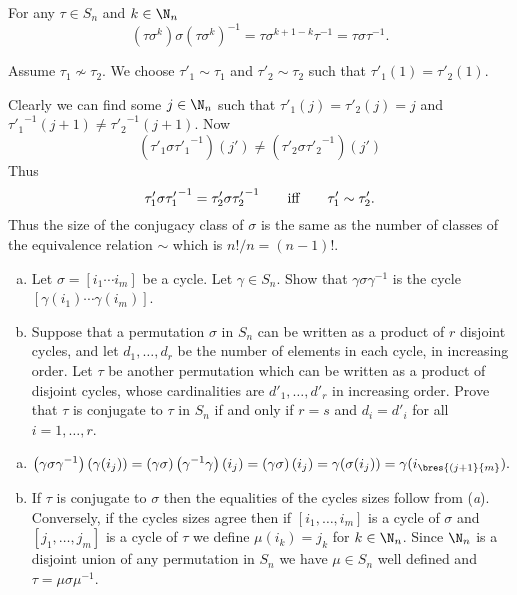 \documentclass[12pt]{book}
\newcounter{myenumi}
\newenvironment{myenumerate}
{\begin{enumerate}
 \setcounter{enumi}{\themyenumi}
}
{\setcounter{myenumi}{\theenumi}
 \end{enumerate}}
\begin{document}
\begin{myenumerate}
For any \(\tau\in S_n\) and \(k \in \N_n\)
\begin{equation*}
(\tau\sigma^k)\sigma\left(\tau\sigma^k\right)^{-1}
= \tau\sigma^{k+1-k}\tau^{-1}
= \tau\sigma\tau^{-1}.
\end{equation*}

Assume \(\tau_1 \nsim \tau_2\).
We choose \(\tau'_1 \sim \tau_1\)
and \(\tau'_2 \sim \tau_2\)
such that
\(\tau'_1(1) = \tau'_2(1)\).

Clearly we can find some \(j\in\N_n\) such that
\(\tau'_1(j) = \tau'_2(j) = j\)
and
\({\tau'_1}^{-1}(j + 1) \neq {\tau'_2}^{-1}(j + 1)\).
Now
\begin{equation*}
\left(\tau'_1 \sigma {\tau'_1}^{-1}\right)(j')
\neq
\left(\tau'_2 \sigma {\tau'_2}^{-1}\right)(j')
\end{equation*}
Thus
\begin{equation*}
\tau'_1 \sigma {\tau'_1}^{-1}
=
\tau'_2 \sigma {\tau'_2}^{-1}
\qquad \textnormal{iff} \qquad
\tau'_1 \sim \tau'_2.
\end{equation*}
Thus the size of the conjugacy class of \(\sigma\)
is the same as the number of classes of the equivalence relation \(\sim\)
which is \(n!/n = (n-1)!\).

\begin{excopy}
\begin{enumerate}[(a)]
\item
Let \(\sigma = [i_1\cdots i_m]\) be a cycle.
Let \(\gamma \in S_n\). Show that \(\gamma\sigma\gamma^{-1}\)
is  the cycle \([\gamma(i_1)\cdots \gamma(i_m)]\).
\item
Suppose that a permutation \(\sigma\) in \(S_n\) can be written
as a product of $r$ disjoint
cycles, and let \(d_1,\ldots,d_r\) be the number of elements in each cycle,
in increasing order.
 Let \(\tau\) be another permutation which can be written as a product of
disjoint cycles, whose cardinalities are
\(d'_1,\ldots,d'_r\)
in increasing order. Prove
that \(\tau\) is conjugate to \(\tau\) in \(S_n\) if and only if
\(r = s\) and \(d_i = d'_i\) for all \(i=1,\ldots,r\).
\end{enumerate}
\end{excopy}

\begin{enumerate}[(a)]
\item
\begin{equation*}
\left(\gamma\sigma\gamma^{-1}\right)(\gamma(i_j))
= \left(\gamma\sigma\right)\left(\gamma^{-1}\gamma\right)(i_j)
= \left(\gamma\sigma\right)(i_j)
= \gamma(\sigma(i_j))
= \gamma(i_{\bres{(j+1}{m}}).
\end{equation*}
\item
If \(\tau\) is conjugate to \(\sigma\) then the equalities
of the cycles sizes follow from (\emph{a}).
Conversely, if the cycles sizes agree then
if \([i_1,\ldots,i_m]\) is a cycle of \(\sigma\)
and  \([j_1,\ldots,j_m]\) is a cycle of \(\tau\)
we define \(\mu(i_k)=j_k\) for \(k\in \N_n\).
Since \(\N_n\) is a disjoint union of any permutation in \(S_n\)
we have \(\mu\in S_n\) well defined
and \(\tau = \mu\sigma\mu^{-1}\).
\end{enumerate}


\end{myenumerate}
\end{document}
